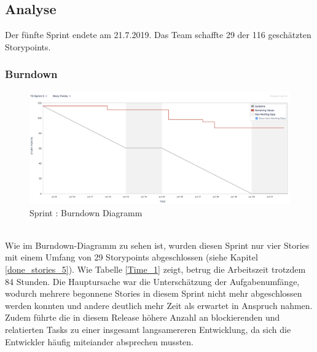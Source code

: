 \documentclass[12pt, titlepage]{scrartcl}
\newcommand{\RN}[1]{%
	\textup{\uppercase\expandafter{\romannumeral#1}}%
}
\begin{document}
        \subsection{Analyse}
        	Der f\"unfte Sprint endete am 21.7.2019. Das Team schaffte 29 der 116 gesch\"atzten Storypoints.
        	\subsubsection{Burndown}
	        	\begin{figure}[H] 
	        		\centering
	        		\includegraphics[width=\textwidth]{images/sprintV/burndown.png}
	        		\caption{Sprint \RN{5}: Burndown Diagramm}
	        		\label{Burndown_5}
	        	\end{figure}
        		\ \\ Wie im Burndown-Diagramm zu sehen ist, wurden diesen Sprint nur vier Stories mit einem Umfang von 29 Storypoints abgeschlossen (siehe Kapitel \ref{done_stories_5}). Wie Tabelle \ref{Time_1} zeigt, betrug die Arbeitszeit trotzdem 84 Stunden. Die Hauptursache war die Untersch\"atzung der Aufgabenumf\"ange, wodurch mehrere begonnene Stories in diesem Sprint nicht mehr abgeschlossen werden konnten und andere deutlich mehr Zeit als erwartet in Anspruch nahmen. Zudem f\"uhrte die in diesem Release h\"ohere Anzahl an blockierenden und relatierten Tasks zu einer insgesamt langsamereren Entwicklung, da sich die Entwickler h\"aufig miteiander absprechen mussten.
\end{document}
